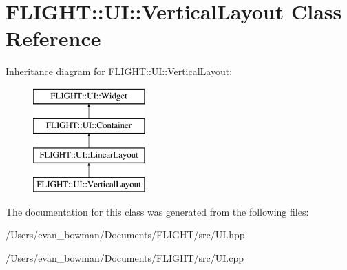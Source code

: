 \hypertarget{class_f_l_i_g_h_t_1_1_u_i_1_1_vertical_layout}{}\section{F\+L\+I\+G\+HT\+:\+:UI\+:\+:Vertical\+Layout Class Reference}
\label{class_f_l_i_g_h_t_1_1_u_i_1_1_vertical_layout}
Inheritance diagram for F\+L\+I\+G\+HT\+:\+:UI\+:\+:Vertical\+Layout\+:\begin{figure}[H]
\begin{center}
\leavevmode
\includegraphics[height=4.000000cm]{class_f_l_i_g_h_t_1_1_u_i_1_1_vertical_layout}
\end{center}
\end{figure}


The documentation for this class was generated from the following files\+:\begin{DoxyCompactItemize}
\item 
/\+Users/evan\+\_\+bowman/\+Documents/\+F\+L\+I\+G\+H\+T/src/U\+I.\+hpp\item 
/\+Users/evan\+\_\+bowman/\+Documents/\+F\+L\+I\+G\+H\+T/src/U\+I.\+cpp\end{DoxyCompactItemize}
